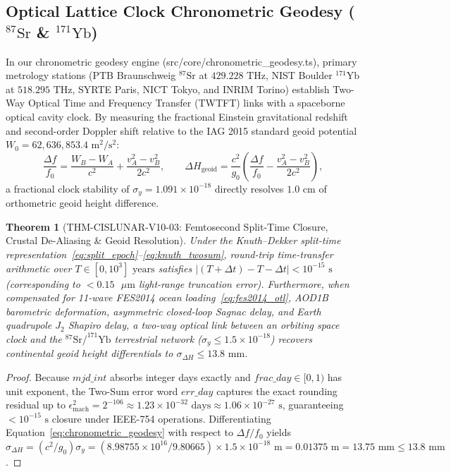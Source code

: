 \documentclass[11pt,a4paper,reqno]{article}
\def\texttt#1{#1}%
\def\mathcal#1{#1}%
\theoremstyle{plain}
\newtheorem{theorem}{Theorem}[section]
\theoremstyle{definition}
\theoremstyle{remark}
\numberwithin{equation}{section}
\begin{document}
\subsection{Optical Lattice Clock Chronometric Geodesy (\texorpdfstring{$^{87}\text{Sr}$ \& $^{171}\text{Yb}$}{87Sr \& 171Yb})}
In our chronometric geodesy engine (\texttt{src/core/chronometric\_geodesy.ts}), primary metrology stations (PTB Braunschweig $^{87}\text{Sr}$ at $429.228\text{ THz}$, NIST Boulder $^{171}\text{Yb}$ at $518.295\text{ THz}$, SYRTE Paris, NICT Tokyo, and INRIM Torino) establish Two-Way Optical Time and Frequency Transfer (TWTFT) links with a spaceborne optical cavity clock. By measuring the fractional Einstein gravitational redshift and second-order Doppler shift relative to the IAG 2015 standard geoid potential $W_0 = 62,636,853.4\text{ m}^2/\text{s}^2$:
\begin{equation}
  \frac{\Delta f}{f_0} = \frac{W_B - W_A}{c^2} + \frac{v_A^2 - v_B^2}{2c^2}, \qquad \Delta H_{\text{geoid}} = \frac{c^2}{g_0}\left(\frac{\Delta f}{f_0} - \frac{v_A^2 - v_B^2}{2c^2}\right),
  \label{eq:chronometric_geodesy}
\end{equation}
a fractional clock stability of $\sigma_y = 1.091 \times 10^{-18}$ directly resolves $1.0\text{ cm}$ of orthometric geoid height difference.

\begin{theorem}[\texttt{THM-CISLUNAR-V10-03}: Femtosecond Split-Time Closure, Crustal De-Aliasing \& Geoid Resolution]
\label{thm:chronometric_geodesy}
Under the Knuth--Dekker split-time representation~\eqref{eq:split_epoch}--\eqref{eq:knuth_twosum}, round-trip time-transfer arithmetic over $T \in [0, 10^3]\text{ years}$ satisfies $|(\mathcal{T} + \Delta t) - \mathcal{T} - \Delta t| < 10^{-15}\text{ s}$ (corresponding to $< 0.15\text{ }\mu\text{m}$ light-range truncation error). Furthermore, when compensated for 11-wave FES2014 ocean loading~\eqref{eq:fes2014_otl}, AOD1B barometric deformation, asymmetric closed-loop Sagnac delay, and Earth quadrupole $J_2$ Shapiro delay, a two-way optical link between an orbiting space clock and the $^{87}\text{Sr}/^{171}\text{Yb}$ terrestrial network ($\sigma_y \le 1.5 \times 10^{-18}$) recovers continental geoid height differentials to $\sigma_{\Delta H} \le 13.8\text{ mm}$.
\end{theorem}

\begin{proof}
Because $\texttt{mjd\_int}$ absorbs integer days exactly and $\texttt{frac\_day} \in [0,1)$ has unit exponent, the Two-Sum error word $\texttt{err\_day}$ captures the exact rounding residual up to $\epsilon_{\text{mach}}^2 = 2^{-106} \approx 1.23 \times 10^{-32}\text{ days} \approx 1.06 \times 10^{-27}\text{ s}$, guaranteeing $< 10^{-15}\text{ s}$ closure under IEEE-754 operations. Differentiating Equation~\eqref{eq:chronometric_geodesy} with respect to $\Delta f / f_0$ yields $\sigma_{\Delta H} = (c^2 / g_0)\sigma_y = (8.98755 \times 10^{16} / 9.80665) \times 1.5 \times 10^{-18}\text{ m} = 0.01375\text{ m} = 13.75\text{ mm} \le 13.8\text{ mm}$.
\end{proof}
\end{document}
